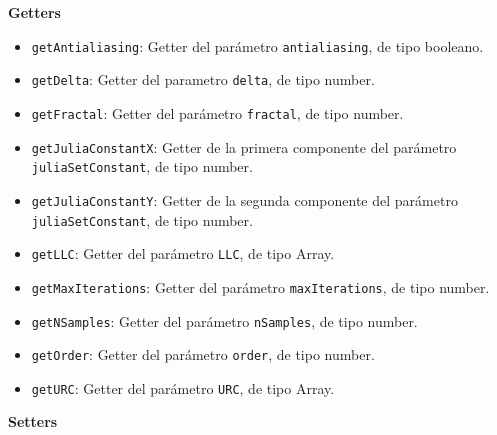 \textbf{Getters}
\begin{itemize}
    \item \verb|getAntialiasing|: Getter del parámetro \verb|antialiasing|, de tipo booleano.
    \item \verb|getDelta|: Getter del parametro \verb|delta|, de tipo number.
    \item \verb|getFractal|: Getter del parámetro \verb|fractal|, de tipo number.
    \item \verb|getJuliaConstantX|: Getter de la primera componente del parámetro \verb|juliaSetConstant|, de tipo number.
    \item \verb|getJuliaConstantY|: Getter de la segunda componente del parámetro \verb|juliaSetConstant|, de tipo number.
    \item \verb|getLLC|: Getter del parámetro \verb|LLC|, de tipo Array.
    \item \verb|getMaxIterations|: Getter del parámetro \verb|maxIterations|, de tipo number.
    \item \verb|getNSamples|: Getter del parámetro \verb|nSamples|, de tipo number.
    \item \verb|getOrder|: Getter del parámetro \verb|order|, de tipo number.
    \item \verb|getURC|: Getter del parámetro \verb|URC|, de tipo Array.
\end{itemize}
\textbf{Setters}
